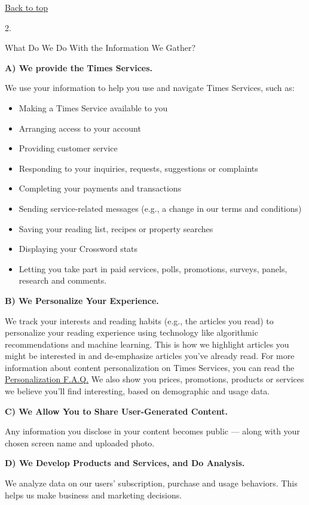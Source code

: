 \href{app}{Back to top}

2.

What Do We Do With the Information We Gather?

\textbf{A) We provide the Times Services.}

We use your information to help you use and navigate Times Services,
such as:

\begin{itemize}
\tightlist
\item
  Making a Times Service available to you
\item
  Arranging access to your account
\item
  Providing customer service
\item
  Responding to your inquiries, requests, suggestions or complaints
\item
  Completing your payments and transactions
\item
  Sending service-related messages (e.g., a change in our terms and
  conditions)
\item
  Saving your reading list, recipes or property searches
\item
  Displaying your Crossword stats
\item
  Letting you take part in paid services, polls, promotions, surveys,
  panels, research and comments.
\end{itemize}

\textbf{B) We Personalize Your Experience.}

We track your interests and reading habits (e.g., the articles you read)
to personalize your reading experience using technology like algorithmic
recommendations and machine learning. This is how we highlight articles
you might be interested in and de-emphasize articles you've already
read. For more information about content personalization on Times
Services, you can read the
\href{https://help.nytimes.com/hc/en-us/articles/360003965994-Personalization}{Personalization
F.A.Q.} We also show you prices, promotions, products or services we
believe you'll find interesting, based on demographic and usage data.

\textbf{C) We Allow You to Share User-Generated Content.}

Any information you disclose in your content becomes public --- along
with your chosen screen name and uploaded photo.

\textbf{D) We Develop Products and Services, and Do Analysis.}

We analyze data on our users' subscription, purchase and usage
behaviors. This helps us make business and marketing decisions.

